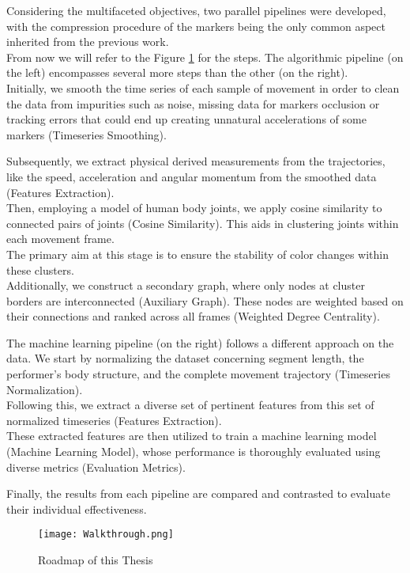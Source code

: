 Considering the multifaceted objectives, two parallel pipelines were developed, with the compression procedure of the markers being the only common aspect inherited from the previous work.
\\
From now we will refer to the Figure \ref{fig:walktrough} for the steps.
The algorithmic pipeline (on the left) encompasses several more steps than the other (on the right). 
\\
Initially, we smooth the time series of each sample of movement in order to clean the data from impurities such as noise, missing data for markers occlusion or tracking errors that could end up creating unnatural accelerations of some markers (Timeseries Smoothing).

Subsequently, we extract physical derived measurements from the trajectories, like the speed, acceleration and angular momentum from the smoothed data (Features Extraction). \\
Then, employing a model of human body joints, we apply cosine similarity to connected pairs of joints (Cosine Similarity). 
This aids in clustering joints within each movement frame. \\
The primary aim at this stage is to ensure the stability of color changes within these clusters. \\
Additionally, we construct a secondary graph, where only nodes at cluster borders are interconnected (Auxiliary Graph).
These nodes are weighted based on their connections and ranked across all frames (Weighted Degree Centrality).

The machine learning pipeline (on the right) follows a different approach on the data. 
We start by normalizing the dataset concerning segment length, the performer's body structure, and the complete movement trajectory (Timeseries Normalization).\\
Following this, we extract a diverse set of pertinent features from this set of normalized timeseries (Features Extraction).\\
These extracted features are then utilized to train a machine learning model (Machine Learning Model), whose performance is thoroughly evaluated using diverse metrics (Evaluation Metrics).

Finally, the results from each pipeline are compared and contrasted to evaluate their individual effectiveness.

\clearpage
\begin{figure}[H]
    \centering
    \vspace*{\fill}
    \texttt{[image: Walkthrough.png]}
    \caption{Roadmap of this Thesis}
    \label{fig:walktrough}
    \vspace*{\fill}
\end{figure}